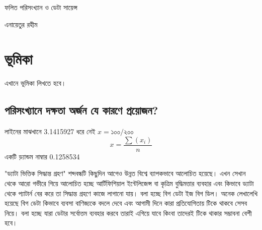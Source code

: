 \documentclass[11pt, twoside, openright, a4paper,xetex]{book}\usepackage[]{graphicx}\usepackage[]{color}
\begin{document}


%

\begin{titlepage}
	\Huge{ফলিত পরিসংখ্যান ও ডেটা সায়েন্স}
	
	\vspace{1in}
	
	\large{এনায়েতুর রহীম}
\end{titlepage}

\resetbengalipage
\bengalipageplainalpha
\tableofcontents
\clearpage
\resetbengalipage
\bengalipagefancynumber
\fancyhead[LO,RE]{\sl\nouppercase\leftmark} %
\fancyhead[LE,RO]{\sl\nouppercase\rightmark} %



\chapter{ভূমিকা}
এখানে ভূমিকা লিখতে হবে।

\section{পরিসংখ্যানে দক্ষতা অর্জন যে কারণে প্রয়োজন?}

লাইনের মাঝখানে  3.1415927  ধরে নেই $x=১০০ / ২০০$
 \[
 x = \frac{\sum(x_i)}{n} 
 \]
 একটি ড়্যান্ডম নাম্বার  0.1258534


"ড্যাটা ভিত্তিক সিদ্ধান্ত গ্রহণ" শব্দবন্ধটি কিছুদিন আগেও উন্নত বিশ্বে ব্যাপকভাবে আলোচিত হয়েছে। এখন সেখান থেকে আরো গভীরে গিয়ে আলোচিত হচ্ছে আর্টিফিশিয়াল ইন্টেলিজেন্স বা কৃত্রিম বুদ্ধিমত্তার ব্যবহার এবং কিভাবে ড্যাটা থেকে প্যাটার্ন বের করে তা সিদ্ধান্ত গ্রহণে কাজে লাগানো যায়। বলা হচ্ছে বিগ ডেটা ইজ বিগ ডিল। অনেক লেখালেখি হয়েছে বিগ ডেটা কিভাবে ব্যবসা বাণিজ্যকে বদলে দেবে এবং আগামী দিনে কারা প্রতিযোগিতায় টিকে থাকবে সেসব নিয়ে। বলা হচ্ছে যারা ডেটার সর্বোত্তম ব্যবহার করবে তারাই এগিয়ে যাবে কিংবা তাদেরই টিকে থাকার সম্ভাবনা বেশী হবে।
\end{document}
